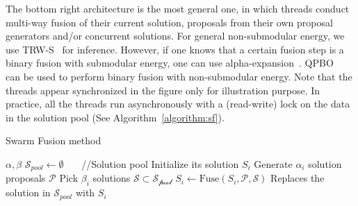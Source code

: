 %
The bottom right architecture is the most general one, in which
threads conduct multi-way fusion of their current solution, proposals
from their own proposal generators and/or concurrent solutions.
%
For general non-submodular energy, we use TRW-S~\cite{TRW-S, opengm} for inference.
%
However, if one knows that a certain fusion step is a binary fusion with
submodular energy, one can use
alpha-expansion~\cite{alpha_expansion}.
%
%
QPBO~\cite{QPBO} can be used to perform binary fusion with non-submodular energy.
Note that the threads appear synchronized in the figure only for
illustration purpose. In practice, all the threads run asynchronously
with a (read-write) lock on the data in the solution pool (See
Algorithm~\ref{algorithm:sf}).
%
%
%
\begin{algorithm}[t]
 \caption{Swarm Fusion method}
 \label{algorithm:sf}
 \begin{algorithmic}
  \Procedure{} {$\alpha, \beta$}
  \State $\mathcal{S}_{pool} \leftarrow \emptyset$ \ \ \ //Solution pool
  \State Initialize its solution $S_i$
  \EndFor
  \State
  \State Generate $\alpha_i$ solution proposals $\mathcal{P}$ %
  \State Pick $\beta_i$ solutions $\mathcal{S} \subset \mathcal{S_{\mbox{pool}}}$
  \State $S_i \leftarrow \mbox{Fuse}(S_i, \mathcal{P}, \mathcal{S})$
  \State Replaces the solution in $\mathcal{S}_{pool}$ with $S_i$
  \EndFor
  \EndProcedure
 \end{algorithmic}
\end{algorithm}



